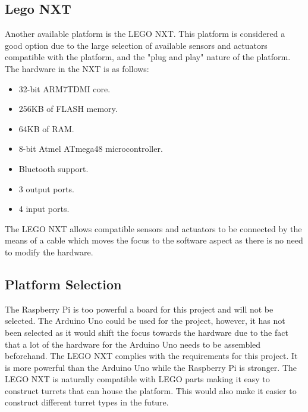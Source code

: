 \subsection{Lego NXT}\label{legonxt}
Another available platform is the LEGO NXT. This platform is considered a good option due to the large selection of available sensors and actuators compatible with the platform, and the "plug and play" nature of the platform. The hardware in the NXT is as follows:

\begin{itemize}
  \item 32-bit ARM7TDMI core.
  \item 256KB of FLASH memory.
  \item 64KB of RAM.
  \item 8-bit Atmel ATmega48 microcontroller.
  \item Bluetooth support.
  \item 3 output ports.
  \item 4 input ports.
\end{itemize}

The LEGO NXT allows compatible sensors and actuators to be connected by the means of a cable which moves the focus to the software aspect as there is no need to modify the hardware.

\subsection{Platform Selection}
The Raspberry Pi is too powerful a board for this project and will not be selected. The Arduino Uno could be used for the project, however, it has not been selected as it would shift the focus towards the hardware due to the fact that a lot of the hardware for the Arduino Uno needs to be assembled beforehand. The LEGO NXT complies with the requirements for this project. It is more powerful than the Arduino Uno while the Raspberry Pi is stronger. The LEGO NXT is naturally compatible with LEGO parts making it easy to construct turrets that can house the platform. This would also make it easier to construct different turret types in the future. 